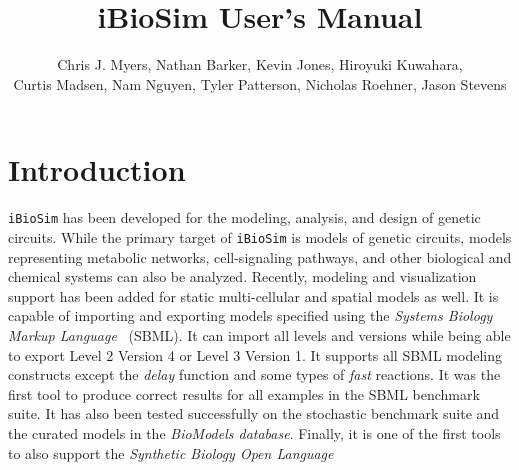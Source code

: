 \documentclass[titlepage,11pt]{article}
\title{iBioSim User's Manual}
\author{Chris J. Myers, Nathan Barker, Kevin Jones, Hiroyuki Kuwahara,\\ Curtis
  Madsen, Nam Nguyen, Tyler Patterson, Nicholas Roehner, Jason Stevens}
\begin{document}
\maketitle

  
\tableofcontents

\clearpage
  

\section{Introduction}

\noindent
{\tt iBioSim} has been developed for the modeling, analysis, and design of genetic circuits.  While the primary target of {\tt iBioSim} is models of genetic circuits, models representing metabolic networks, cell-signaling pathways, and other biological and chemical systems can also be analyzed.  Recently, modeling and visualization support has been added for static multi-cellular and spatial models as well.
It is capable of importing and exporting models specified using the %
\emph{Systems Biology Markup Language}
~(SBML).  It can import all levels and versions while being able to export Level 2 Version 4 or Level 3 Version 1.  It supports all SBML modeling constructs except the \emph{delay} function and some types of \emph{fast} reactions.  It was the first tool to produce correct results for all examples in the SBML benchmark suite.  It has also been tested successfully on the stochastic benchmark suite and the curated models in the 
\emph{BioModels database}.
Finally, it is one of the first tools to also support the 
\emph{Synthetic Biology Open Language}
\end{document}
